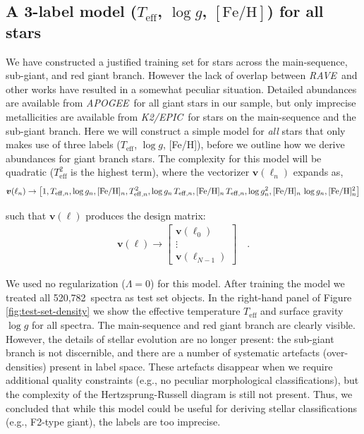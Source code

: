 \documentclass[preprint,trackchanges]{aastex}
\newcommand{\acronym}[1]{{\small{#1}}}
\newcommand{\project}[1]{\textsl{#1}}
\newcommand{\rave}{\project{\acronym{RAVE}}}
\newcommand{\apogee}{\project{\acronym{APOGEE}}}
\newcommand{\epic}{\project{K2/EPIC}}
\newcommand{\teff}{T_{\mathrm{eff}}}
\newcommand{\logg}{\log g}
\newcommand{\feh}{[\mathrm{Fe/H}]}
\newcommand{\Nspectra}{520,782}
\newcommand{\Dvector}[1]{\boldsymbol{#1}}
\newcommand{\vecv}{\Dvector{v}}
\begin{document}
\subsection{A 3-label model ($\teff$, $\logg$, $\feh$) for all stars}
\label{sec:a-simple-model}


We have constructed a justified training set for stars across the main-sequence, sub-giant,
and red giant branch.  However the lack of overlap between \rave\ and other works have
resulted in a somewhat peculiar situation.  Detailed abundances are available from \apogee\
for all giant stars in our sample, but only imprecise metallicities are available from
\epic\ for stars on the main-sequence and the sub-giant branch.  Here we will construct 
a simple model for \emph{all} stars that only makes use of three labels ($\teff$, $\logg$, 
[Fe/H]), before we outline how we derive abundances for giant branch stars.  The complexity
for this model will be quadratic ($\teff^2$ is the highest term), where the vectorizer 
$\vecv(\ell_n)$ expands as,
\begin{eqnarray}\label{eq:vectorizer-three-label}
\vecv(\ell_n) \rightarrow \left[1, T_{{\rm eff},n}, \logg_n, [{\rm Fe/H}]_n, T_{{\rm eff},n}^2, \logg_n\,T_{{\rm eff},n}, \feh_n\,T_{{\rm eff},n}, \logg_n^2, \feh_n\,\logg_n, \feh_n^2\right]
\end{eqnarray}

\noindent{}such that $\vecv(\ell)$ produces the design matrix:
\begin{eqnarray}
	\vecv(\ell) \rightarrow \begin{bmatrix} \vecv(\ell_0) \\ \vdots \\ \vecv(\ell_{N-1}) \end{bmatrix} \quad .
\end{eqnarray}


We used no regularization ($\Lambda = 0$) for this model.  After training the model we
treated all \Nspectra\ spectra as test set objects.  In the right-hand panel of Figure 
\ref{fig:test-set-density} we show the effective temperature $\teff$ and surface gravity 
$\logg$ for all spectra.  The main-sequence and red giant branch are clearly visible.  
However, the details of stellar evolution are no longer present: the sub-giant branch is 
not discernible, and there are a number of systematic artefacts (over-densities) present
in label space.  These artefacts disappear when we require additional quality constraints 
(e.g., no peculiar morphological classifications), but the complexity of the 
Hertzsprung-Russell diagram is still not present.  Thus, we concluded that while this 
model could be useful for deriving stellar classifications (e.g., F2-type giant), the 
labels are too imprecise.
\end{document}
